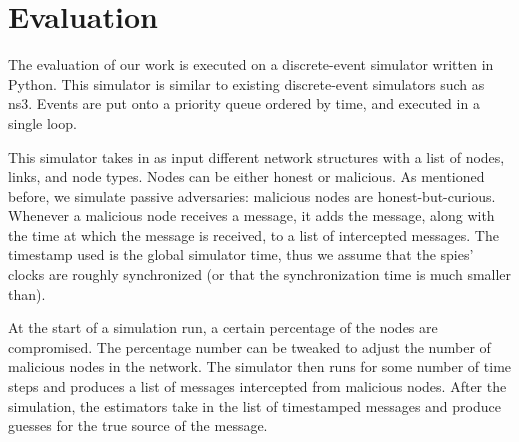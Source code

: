 \section{Evaluation}

The evaluation of our work is executed on a discrete-event simulator written in Python. This simulator is similar to existing discrete-event simulators such as ns3. Events are put onto a priority queue ordered by time, and executed in a single loop.

This simulator takes in as input different network structures with a list of nodes, links, and node types. 
Nodes can be either honest or malicious. As mentioned before, we simulate passive adversaries: malicious nodes are honest-but-curious. Whenever a malicious node receives a message, it adds the message, along with the time at which the message is received, to a list of intercepted messages. The timestamp used is the global simulator time, thus we assume that the spies' clocks are roughly synchronized (or that the synchronization time is much smaller than). 

At the start of a simulation run, a certain percentage of the nodes are compromised. The percentage number can be tweaked to adjust the number of malicious nodes in the network. The simulator then runs for some number of time steps and produces a list of messages intercepted from malicious nodes. After the simulation, the estimators take in the list of timestamped messages and produce guesses for the true source of the message.

